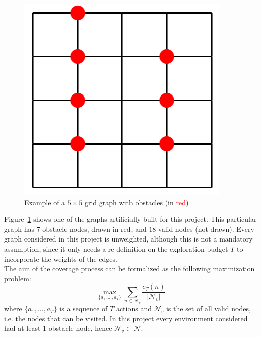 \documentclass[a4paper]{article}
\begin{document}
\begin{figure}[!h]
    \centering
    \includegraphics[scale=0.3]{figures/graph_exmp.png}
    \caption{Example of a $5 \times 5$ grid graph with obstacles (in \textcolor{red}{red})}
    \label{fig:graph_exmp}
\end{figure}

Figure~\ref{fig:graph_exmp} shows one of the graphs artificially built for this project. This particular graph has $7$ obstacle nodes, drawn in red, and $18$ valid nodes (not drawn). Every graph considered in this project is unweighted, although this is not a mandatory assumption, since it only needs a re-definition on the exploration budget $T$ to incorporate the weights of the edges. \\
The aim of the coverage process can be formalized as the following maximization problem:
\begin{equation}
    \max_{\{a_1, \dots, a_T\}} \sum_{n \in \mathcal{N}_v} \frac{c_T(n)}{|\mathcal{N}_v|}
\end{equation}
where $\{a_1, \dots, a_T\}$ is a sequence of $T$ actions and $\mathcal{N}_v$ is the set of all valid nodes, i.e. the nodes that can be visited. In this project every environment considered had at least $1$ obstacle node, hence $\mathcal{N}_v \subset \mathcal{N}$.
\end{document}
